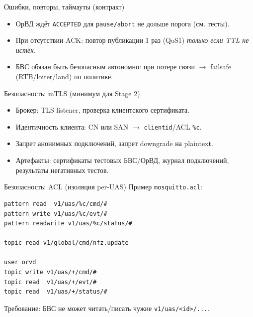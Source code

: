 \documentclass[aspectratio=169]{beamer}
\begin{document}
\begin{frame}[fragile]{Ошибки, повторы, таймауты (контракт)}
\begin{itemize}
  \item ОрВД ждёт \texttt{ACCEPTED} для \texttt{pause/abort} не дольше порога (см. тесты).
  \item При отсутствии ACK: повтор публикации 1 раз (QoS1) \textit{только если TTL не истёк}.
  \item БВС обязан быть безопасным автономно: при потере связи $\rightarrow$ failsafe (RTB/loiter/land) по политике.
\end{itemize}
\end{frame}

\begin{frame}[fragile]{Безопасность: mTLS (минимум для Stage 2)}
\begin{itemize}
  \item Брокер: TLS listener, проверка клиентского сертификата.
  \item Идентичность клиента: CN или SAN $\rightarrow$ \texttt{clientid}/ACL \texttt{\%c}.
  \item Запрет анонимных подключений, запрет downgrade на plaintext.
  \item Артефакты: сертификаты тестовых БВС/ОрВД, журнал подключений, результаты негативных тестов.
\end{itemize}
\end{frame}

\begin{frame}[fragile]{Безопасность: ACL (изоляция per-UAS)}
\small
Пример \texttt{mosquitto.acl}:
\begin{verbatim}
pattern read  v1/uas/%c/cmd/#
pattern write v1/uas/%c/evt/#
pattern readwrite v1/uas/%c/status/#

topic read v1/global/cmd/nfz.update

user orvd
topic write v1/uas/+/cmd/#
topic read  v1/uas/+/evt/#
topic read  v1/uas/+/status/#
\end{verbatim}
Требование: БВС не может читать/писать чужие \texttt{v1/uas/<id>/...}.
\end{frame}
\end{document}
